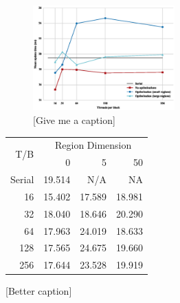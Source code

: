 \documentclass[onecolumn,12pt]{IEEEtran}
\begin{document}
  \begin{figure}[t]
      \centering
      \begin{minipage}{\textwidth}
          \begin{subfigure}[t]{0.4\textwidth}
              \includegraphics[width=0.6\textwidth]{../images/plot.eps}
              \caption{[Give me a caption]}
              \label{fig:comparison}  
          \end{subfigure}
          \begin{subtable}[t]{0.4\textwidth}
              \begin{tabular}[b]{@{}*{4}{r}@{}} \toprule
                  \multirow{2}{*}{T/B} 
                  & \multicolumn{3}{c}{Region Dimension} \\
                  & 0        & 5       & 50 \\ \midrule 
                  Serial           &  19.514  &  N/A    & NA \\
                  16               &  15.402  &  17.589 &  18.981 \\
                  32               &  18.040  &  18.646 &  20.290 \\
                  64               &  17.963  &  24.019 &  18.633 \\
                  128              &  17.565  &  24.675 &  19.660 \\
                  256              &  17.644  &  23.528 & 19.919 \\ \bottomrule
              \end{tabular}
              \caption{[Better caption]}
              \label{tab:means}
          \end{subtable}
      \end{minipage}
  \end{figure}
\end{document}
